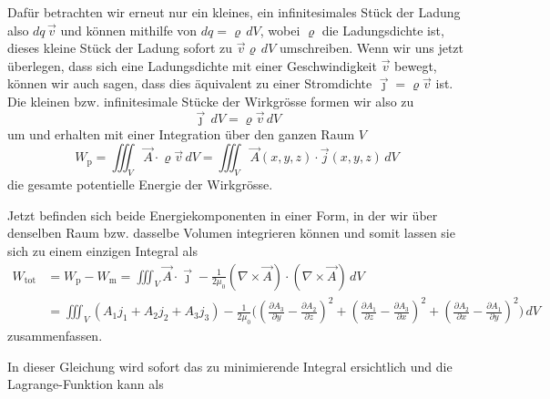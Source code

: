 Dafür betrachten wir erneut nur ein kleines, ein infinitesimales Stück der Ladung also $dq\,\vec{v}$ und können mithilfe von $dq = \varrho\,dV$, wobei $\varrho$ die Ladungsdichte ist, dieses kleine Stück der Ladung sofort zu $\vec{v}\varrho\,dV$ umschreiben.
Wenn wir uns jetzt überlegen, dass sich eine Ladungsdichte mit einer Geschwindigkeit $\vec{v}$ bewegt, können wir auch sagen, dass dies äquivalent zu einer Stromdichte $\vec{\jmath}=\varrho\vec{v}$ ist. 
Die kleinen bzw. infinitesimale Stücke der Wirkgrösse formen wir also zu \[\vec{\jmath}\,dV = \varrho\vec{v}\,dV\]
um und erhalten mit einer Integration über den ganzen Raum $V$
\begin{equation}
	W_{\text{p}}
	= 
	\iiint_V \vec{A}\cdot\varrho\vec{v}\,dV
	=
	\iiint_V \vec{A}(x,y,z)\cdot\vec{j}(x,y,z)\,dV
\end{equation}
die gesamte potentielle Energie der Wirkgrösse.

Jetzt befinden sich beide Energiekomponenten in einer Form, in der wir über denselben Raum bzw. dasselbe Volumen integrieren können und somit lassen sie sich zu einem einzigen Integral als 
\begin{align*}
W_{\text{tot}} 
&=
W_{\text{p}} - W_{\text{m}}
=
\iiint_V \vec{A}\cdot\vec{\jmath}
- \frac{1}{2\mu_0}\left(\nabla\times\vec{A}\right)\cdot\left(\nabla\times\vec{A}\right)\, dV \\
&=
\iiint_V \left( A_1j_1 + A_2j_2 + A_3j_3\right) - 
 \frac{1}{2\mu_0}\biggl( 
 	\left( \frac{\partial A_3}{\partial y} -\frac{\partial A_2}{\partial z}\right)^2 
 + \left( \frac{\partial A_1}{\partial z} -\frac{\partial A_3}{\partial x}\right)^2
 + \left(\frac{\partial A_2}{\partial x} -\frac{\partial A_1}{\partial y} \right)^2   
 \biggr) \,dV
\end{align*}
zusammenfassen.

In dieser Gleichung wird sofort das zu minimierende Integral ersichtlich und die Lagrange-Funktion kann als 

	
